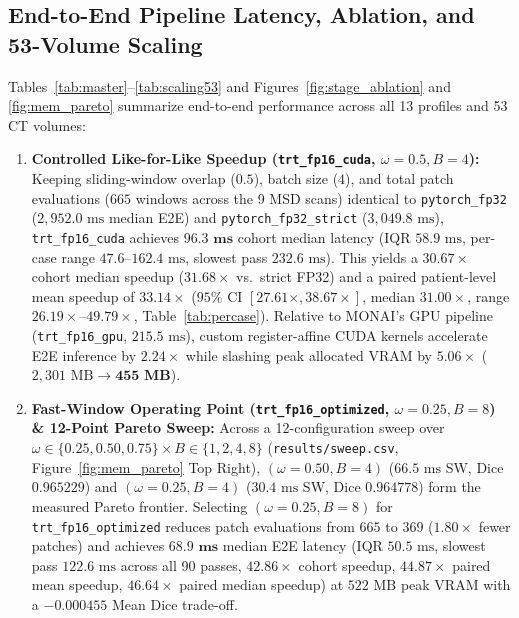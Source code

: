 \documentclass[10pt,twocolumn]{article}
\begin{document}
\subsection{End-to-End Pipeline Latency, Ablation, and 53-Volume Scaling}
Tables~\ref{tab:master}--\ref{tab:scaling53} and Figures~\ref{fig:stage_ablation} and \ref{fig:mem_pareto} summarize end-to-end performance across all 13 profiles and 53 CT volumes:
\begin{enumerate}
    \item \textbf{Controlled Like-for-Like Speedup (\texttt{trt\_fp16\_cuda}, $\omega=0.5, B=4$):} Keeping sliding-window overlap ($0.5$), batch size ($4$), and total patch evaluations ($665$ windows across the 9 MSD scans) identical to \texttt{pytorch\_fp32} ($2,952.0\text{ ms}$ median E2E) and \texttt{pytorch\_fp32\_strict} ($3,049.8\text{ ms}$), \texttt{trt\_fp16\_cuda} achieves $\mathbf{96.3\textbf{ ms}}$ cohort median latency (IQR $58.9\text{ ms}$, per-case range $47.6\text{--}162.4\text{ ms}$, slowest pass $232.6\text{ ms}$). This yields a $\mathbf{30.67\times}$ cohort median speedup ($\mathbf{31.68\times}$ vs.\ strict FP32) and a paired patient-level mean speedup of $\mathbf{33.14\times}$ ($95\%$ CI $[27.61\times, 38.67\times]$, median $31.00\times$, range $26.19\times\text{--}49.79\times$, Table~\ref{tab:percase}). Relative to MONAI's GPU pipeline (\texttt{trt\_fp16\_gpu}, $215.5\text{ ms}$), custom register-affine CUDA kernels accelerate E2E inference by $2.24\times$ while slashing peak allocated VRAM by $\mathbf{5.06\times}$ ($2,301\text{ MB} \to \mathbf{455\textbf{ MB}}$).
    \item \textbf{Fast-Window Operating Point (\texttt{trt\_\allowbreak fp16\_\allowbreak optimized}, $\omega=0.25, B=8$) \& 12-Point Pareto Sweep:} Across a 12-configuration sweep over $\omega \in \{0.25, 0.50, 0.75\} \times B \in \{1, 2, 4, 8\}$ (\texttt{results/\allowbreak sweep.csv}, Figure~\ref{fig:mem_pareto} Top Right), $(\omega=0.50, B=4)$ ($66.5\text{ ms}$ SW, Dice $0.965229$) and $(\omega=0.25, B=4)$ ($30.4\text{ ms}$ SW, Dice $0.964778$) form the measured Pareto frontier. Selecting $(\omega=0.25, B=8)$ for \texttt{trt\_\allowbreak fp16\_\allowbreak optimized} reduces patch evaluations from $665$ to $369$ ($1.80\times$ fewer patches) and achieves $\mathbf{68.9\textbf{ ms}}$ median E2E latency (IQR $50.5\text{ ms}$, slowest pass $122.6\text{ ms}$ across all 90 passes, $\mathbf{42.86\times}$ cohort speedup, $\mathbf{44.87\times}$ paired mean speedup, $\mathbf{46.64\times}$ paired median speedup) at $522\text{ MB}$ peak VRAM with a $-0.000455$ Mean Dice trade-off.

\end{enumerate}
\end{document}
